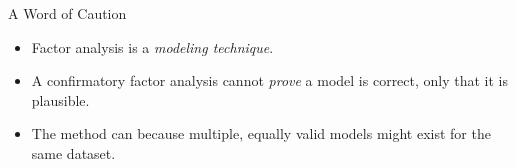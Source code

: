 \documentclass[aspectratio=169]{beamer}
\begin{document}
\begin{frame}{A Word of Caution}
  \begin{itemize}
    \item Factor analysis is a \textit{modeling technique}.
    \item A confirmatory factor analysis cannot \textit{prove} a model is correct, only that it is plausible.
    \item The method can because multiple, equally valid models might exist for the same dataset.
  \end{itemize}
\end{frame}
\end{document}
